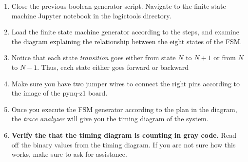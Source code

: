 \documentclass{article}
\begin{document}
\begin{enumerate}
\item Close the previous boolean generator script.  Navigate to the finite state machine Jupyter notebook in the logictools directory.
\item Load the finite state machine generator according to the steps, and examine the diagram explaining the relationship between the eight states of the FSM.
\item Notice that each state \textit{transition} goes either from state $N$ to $N+1$ or from $N$ to $N-1$.  Thus, each state either goes forward or backward
\item Make sure you have two jumper wires to connect the right pins according to the image of the pynq-z1 board.
\item Once you execute the FSM generator according to the plan in the diagram, the \textit{trace analyzer} will give you the timing diagram of the system.
\item \textbf{Verify the that the timing diagram is counting in gray code.}  Read off the binary values from the timing diagram.  If you are not sure how this works, make sure to ask for assistance.
\end{enumerate}
\end{document}

